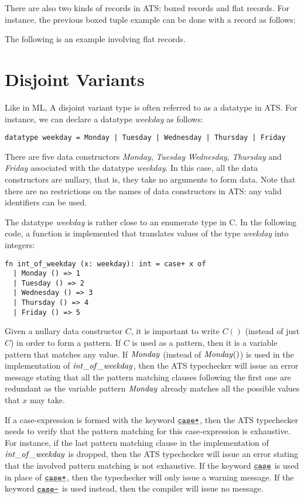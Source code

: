There are also two kinds of records in ATS: boxed records and flat records.
For instance, the previous boxed tuple example can be done with a record as
follows:

The following is an example involving flat records.


\section{Disjoint Variants}

Like in ML, A disjoint variant type is often referred to as a datatype in
ATS. For instance, we can declare a datatype {\it weekday} as follows:
\begin{verbatim}
datatype weekday = Monday | Tuesday | Wednesday | Thursday | Friday
\end{verbatim}
There are five data constructors {\it Monday}, {\it Tuesday} {\it
Wednesday}, {\it Thursday} and {\it Friday} associated with the datatype
{\it\blue weekday}. In this case, all the data constructors are nullary, that
is, they take no arguments to form data. Note that there are no
restrictions on the names of data constructors in ATS: any valid
identifiers can be used.

The datatype {\it weekday} is rather close to an enumerate type in C. In
the following code, a function is implemented that translates values
of the type {\it weekday} into integers:
\begin{verbatim}
fn int_of_weekday (x: weekday): int = case+ x of
  | Monday () => 1
  | Tuesday () => 2
  | Wednesday () => 3
  | Thursday () => 4
  | Friday () => 5
\end{verbatim}
Given a nullary data constructor $C$, it is important to write $C()$
(instead of just $C$) in order to form a pattern. If $C$ is used as a
pattern, then it is a variable pattern that matches any value. If ${\it
Monday}$ (instead of ${\it Monday ()}$) is used in the implementation of
${\it int\_of\_weekday}$, then the ATS typechecker will issue an error
message stating that all the pattern matching clauses following the first
one are redundant as the variable pattern ${\it Monday}$ already matches
all the possible values that $x$ may take.

If a case-expression is formed with the keyword $\underline{\texttt{case+}}$, then the ATS
typechecker needs to verify that the pattern matching for this
case-expression is exhaustive. For instance, if the last pattern matching
clause in the implementation of ${\it int\_of\_weekday}$ is dropped, then
the ATS typechecker will issue an error stating that the involved pattern
matching is not exhaustive. If the keyword $\underline{\texttt{case}}$ is used in place of
$\underline{\texttt{case+}}$, then the typechecker will only issue a warning message. If
the keyword $\underline{\texttt{case-}}$ is used instead, then the compiler will issue no
message.

